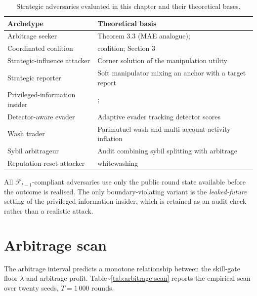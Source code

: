 \documentclass[
  11pt,
  a4paper,
  oneside]{report}
\begin{document}
\begin{table}[h]
\centering
\small
\begin{tabular}{lp{7cm}}
\toprule
Archetype & Theoretical basis \\
\midrule
Arbitrage seeker & \citet{chen2014arbitrage} Theorem 3.3 (MAE
  analogue); \citet{chun2011cooperating} \\
Coordinated coalition & \citet{chun2011cooperating} coalition;
  \citet{chen2014arbitrage} Section 3 \\
Strategic-influence attacker & Corner solution of the manipulation
  utility \\
Strategic reporter & Soft manipulator mixing an anchor with a
  target report \\
Privileged-information insider & \citet{lambert2008selffinanced};
  \citet{johnstone2007economic} \\
Detector-aware evader & Adaptive evader tracking detector scores \\
Wash trader & Parimutuel wash and multi-account activity
  inflation \\
Sybil arbitrageur & Audit combining sybil splitting with
  arbitrage \\
Reputation-reset attacker & \citet{feldman2004freeriding}
  whitewashing \\
\bottomrule
\end{tabular}
\caption{Strategic adversaries evaluated in this chapter and their
theoretical bases.}
\label{tab:adversary-catalogue}
\end{table}

All \(\mathcal{F}_{t-1}\)-compliant adversaries use only the public
round state available before the outcome is realised. The only
boundary-violating variant is the \emph{leaked-future} setting of the
privileged-information insider, which is retained as an audit check
rather than a realistic attack.

\section{Arbitrage scan}\label{arbitrage-scan}

The \citet{chen2014arbitrage} arbitrage interval predicts a monotone
relationship between the skill-gate floor \(\lambda\) and arbitrage
profit. Table\textasciitilde{}\ref{tab:arbitrage-scan} reports the
empirical scan over twenty seeds, \(T = 1\,000\) rounds.
\end{document}
